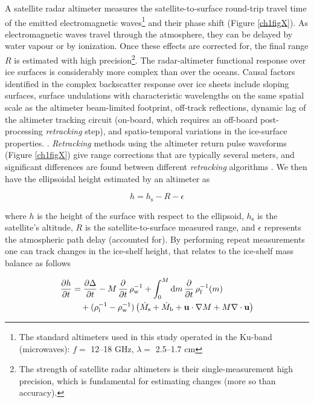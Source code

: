 A satellite radar altimeter measures the satellite-to-surface round-trip travel time of the emitted electromagnetic waves\footnote{The standard altimeters used in this study operated in the Ku-band (microwaves): $f =$ 12--18 GHz, $\lambda =$ 2.5--1.7 cm} and their phase shift (Figure \ref{ch1figX}). As electromagnetic waves travel through the atmosphere, they can be delayed by water vapour or by ionization. Once these effects are corrected for, the final range $R$ is estimated with high precision\footnote{The strength of satellite radar altimeters is their single-measurement high precision, which is fundamental for estimating changes (more so than accuracy).}. The radar-altimeter functional response over ice surfaces is considerably more complex than over the oceans. Causal factors identified in the complex backscatter response over ice sheets include sloping surfaces, surface undulations with characteristic wavelengths on the same spatial scale as the altimeter beam-limited footprint, off-track reflections, dynamic lag of the altimeter tracking circuit (on-board, which requires an off-board post-processing \emph{retracking} step), and spatio-temporal variations in the ice-surface properties. \parencite{Martin1983}. \emph{Retracking} methods using the altimeter return pulse waveforms (Figure \ref{ch1figX}) give range corrections that are typically several meters, and significant differences are found between different \emph{retracking} algorithms \parencite{Davis1996}. We then have the ellipsoidal height estimated by an altimeter as

\begin{equation}
  h = h_\text{s} - R - \epsilon
\end{equation}

where $h$ is the height of the surface with respect to the ellipsoid, $h_\text{s}$ is the satellite's altitude, $R$ is the satellite-to-surface measured range, and $\epsilon$ represents the atmospheric path delay (accounted for). By performing repeat measurements one can track changes in the ice-shelf height, that relates to the ice-shelf mass balance as follows

\begin{equation}
\begin{split}
  \frac{\partial h}{\partial t} &= \frac{\partial \Delta}{\partial t}
    - M \, \frac{\partial}{\partial t} \, \rho^{-1}_\text{w}
    + \int^M_0 \text{d}m \, \frac{\partial}{\partial t} \, \rho^{-1}_\text{f}(m) \\
    &\quad + ( \rho^{-1}_\text{i} - \rho^{-1}_\text{w} ) 
              \left( \dot{M}_\text{s} + \dot{M}_\text{b} + \mathbf{u} \cdot \nabla M
              + M \nabla \cdot \mathbf{u} \right)
\end{split}
\end{equation}

